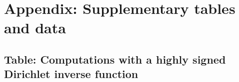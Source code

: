 \documentclass[11pt,reqno,a4letter]{article}
\numberwithin{figure}{section}
\numberwithin{table}{section}
\theoremstyle{plain}
\numberwithin{theorem}{section}
\theoremstyle{definition}
\begin{document}
\newpage
\setcounter{section}{0} 
\renewcommand{\thesection}{\Alph{section}} 
\renewcommand{\thesubsection}{T.\arabic{subsection}} 

\section{Appendix: Supplementary tables and data} 

\newpage
\subsection{Table: Computations with a highly signed Dirichlet inverse function} 
\label{table_conjecture_Mertens_ginvSeq_approx_values}

\begin{table}[h!]

\centering


\end{table}
\end{document}
